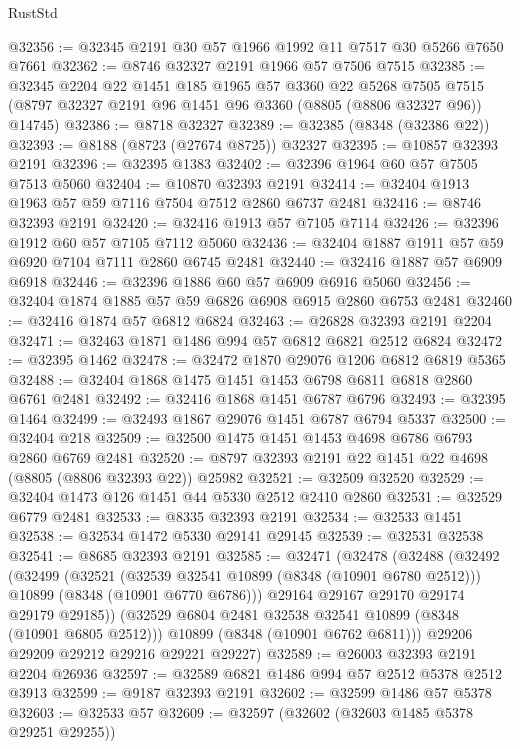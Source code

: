 \begin{lexlean}{RustStd}
\begin{coremodule}
@32356 := @32345 @2191 @30 @57 @1966 @1992 @11 @7517 @30 @5266 @7650 @7661
@32362 := @8746 @32327 @2191 @1966 @57 @7506 @7515
@32385 := @32345
    @2204
    @22
    @1451
    @185
    @1965
    @57
    @3360
    @22
    @5268
    @7505
    @7515
    (@8797 @32327 @2191 @96 @1451 @96 @3360 (@8805 (@8806 @32327 @96)) @14745)
@32386 := @8718 @32327
@32389 := @32385 (@8348 (@32386 @22))
@32393 := @8188 (@8723 (@27674 @8725)) @32327
@32395 := @10857 @32393 @2191
@32396 := @32395 @1383
@32402 := @32396 @1964 @60 @57 @7505 @7513 @5060
@32404 := @10870 @32393 @2191
@32414 := @32404 @1913 @1963 @57 @59 @7116 @7504 @7512 @2860 @6737 @2481
@32416 := @8746 @32393 @2191
@32420 := @32416 @1913 @57 @7105 @7114
@32426 := @32396 @1912 @60 @57 @7105 @7112 @5060
@32436 := @32404 @1887 @1911 @57 @59 @6920 @7104 @7111 @2860 @6745 @2481
@32440 := @32416 @1887 @57 @6909 @6918
@32446 := @32396 @1886 @60 @57 @6909 @6916 @5060
@32456 := @32404 @1874 @1885 @57 @59 @6826 @6908 @6915 @2860 @6753 @2481
@32460 := @32416 @1874 @57 @6812 @6824
@32463 := @26828 @32393 @2191 @2204
@32471 := @32463 @1871 @1486 @994 @57 @6812 @6821 @2512 @6824
@32472 := @32395 @1462
@32478 := @32472 @1870 @29076 @1206 @6812 @6819 @5365
@32488 := @32404 @1868 @1475 @1451 @1453 @6798 @6811 @6818 @2860 @6761 @2481
@32492 := @32416 @1868 @1451 @6787 @6796
@32493 := @32395 @1464
@32499 := @32493 @1867 @29076 @1451 @6787 @6794 @5337
@32500 := @32404 @218
@32509 := @32500 @1475 @1451 @1453 @4698 @6786 @6793 @2860 @6769 @2481
@32520 := @8797 @32393 @2191 @22 @1451 @22 @4698 (@8805 (@8806 @32393 @22)) @25982
@32521 := @32509 @32520
@32529 := @32404 @1473 @126 @1451 @44 @5330 @2512 @2410 @2860
@32531 := @32529 @6779 @2481
@32533 := @8335 @32393 @2191
@32534 := @32533 @1451
@32538 := @32534 @1472 @5330 @29141 @29145
@32539 := @32531 @32538
@32541 := @8685 @32393 @2191
@32585 := @32471
    (@32478
      (@32488
        (@32492
          (@32499
            (@32521
              (@32539 @32541 @10899 (@8348 (@10901 @6780 @2512)))
              @10899
              (@8348 (@10901 @6770 @6786)))
            @29164
            @29167
            @29170
            @29174
            @29179
            @29185))
        (@32529 @6804 @2481 @32538 @32541 @10899 (@8348 (@10901 @6805 @2512)))
        @10899
        (@8348 (@10901 @6762 @6811)))
      @29206
      @29209
      @29212
      @29216
      @29221
      @29227)
@32589 := @26003 @32393 @2191 @2204 @26936
@32597 := @32589 @6821 @1486 @994 @57 @2512 @5378 @2512 @3913
@32599 := @9187 @32393 @2191
@32602 := @32599 @1486 @57 @5378
@32603 := @32533 @57
@32609 := @32597 (@32602 (@32603 @1485 @5378 @29251 @29255))

\end{coremodule}
\end{lexlean}
